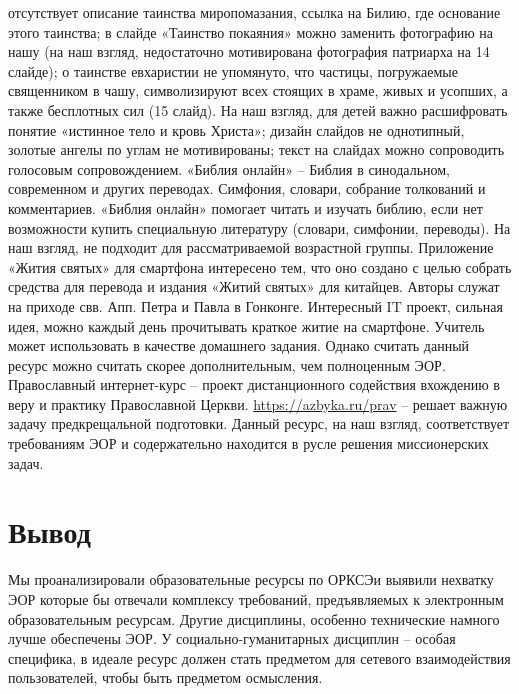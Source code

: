 отсутствует описание таинства миропомазания, ссылка на Билию, где основание этого таинства;
в слайде «Таинство покаяния» можно заменить фотографию на нашу (на наш взгляд, недостаточно мотивирована фотография патриарха на 14 слайде);
о таинстве евхаристии не упомянуто, что частицы, погружаемые священником в чашу, символизируют всех стоящих в храме, живых и усопших, а также бесплотных сил (15 слайд). На наш взгляд, для детей важно расшифровать понятие «истинное тело и кровь Христа»;
дизайн слайдов не однотипный, золотые ангелы по углам не мотивированы;
текст на слайдах можно сопроводить голосовым сопровождением.
«Библия онлайн» – Библия в синодальном, современном и других переводах. Симфония, словари, собрание толкований и комментариев. «Библия онлайн» помогает читать и изучать библию, если нет возможности купить специальную литературу (словари, симфонии, переводы). На наш взгляд, не подходит для рассматриваемой возрастной группы.
Приложение «Жития святых» для смартфона интересено тем, что оно создано с целью собрать средства для перевода и издания «Житий святых» для китайцев. Авторы служат на приходе свв. Апп. Петра и Павла в Гонконге. Интересный IT проект, сильная идея, можно каждый день прочитывать краткое житие на смартфоне. Учитель может использовать в качестве домашнего задания. Однако считать данный ресурс можно считать скорее дополнительным, чем полноценным ЭОР.
Православный интернет-курс – проект дистанционного содействия вхождению в веру и практику Православной Церкви. \url{https://azbyka.ru/prav} – решает важную задачу предкрещальной подготовки. Данный ресурс, на наш взгляд, соответствует требованиям ЭОР и содержательно находится в русле решения миссионерских задач.

\section{Вывод}
 Мы проанализировали образовательные ресурсы по ОРКСЭи выявили нехватку ЭОР которые бы отвечали комплексу требований, предъявляемых к электронным образовательным ресурсам. Другие дисциплины, особенно технические намного лучше обеспечены ЭОР. У социально-гуманитарных дисциплин – особая специфика, в идеале ресурс должен стать предметом для сетевого взаимодействия пользователей, чтобы быть предметом осмысления.

